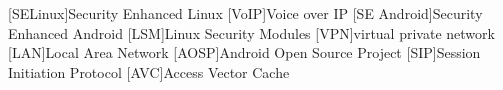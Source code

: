 [SELinux]{Security Enhanced Linux}
[VoIP]{Voice over IP}
[SE Android]{Security Enhanced Android}
[LSM]{Linux Security Modules}
[VPN]{virtual private network}
[LAN]{Local Area Network}
[AOSP]{Android Open Source Project}
[SIP]{Session Initiation Protocol}
[AVC]{Access Vector Cache}
